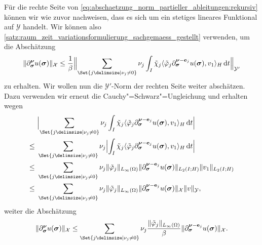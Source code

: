 \documentclass[../main.tex]{subfiles}
\begin{document}
\begin{Satz}
\begin{Beweis}
        Für die rechte Seite von \cref{eq:abschaetzung_norm_partieller_ableitungen:rekursiv} können wir wie zuvor nachweisen, dass es sich um ein stetiges lineares Funktional auf $\mathcal Y$ handelt.
        Wir können also \cref{satz:raum_zeit_variationsformulierung_sachgemaess_gestellt} verwenden, um die Abschätzung
        \begin{equation}
            \norm{\partial^{\bm\nu}_{\bm\sigma} u(\bm\sigma)}_{\mathcal X} \leq \frac{1}{\beta} \norm[\Big]{\sum_{\Set{j \given \nu_{j} \neq 0}} \nu_{j} \int_{I} \tilde{\chi}_{j} \skp{\tilde{\varphi}_{j} \partial^{\bm\nu - \vec e_{j}}_{\bm\sigma} u(\bm\sigma)}{v_{1}}{H} \diff t}_{\mathcal Y'}
        \end{equation}
        zu erhalten.
        Wir wollen nun die $\mathcal Y'$-Norm der rechten Seite weiter abschätzen.
        Dazu verwenden wir erneut die Cauchy"=Schwarz"=Ungleichung und erhalten wegen
        \begin{align}
            &\abs[\Big]{\sum_{\Set{j \given \nu_{j} \neq 0}} \nu_{j} \int_{I} \tilde{\chi}_{j} \skp{\tilde{\varphi}_{j} \partial^{\bm\nu - \vec e_{j}}_{\bm\sigma} u(\bm\sigma)}{v_{1}}{H} \diff t}
            \\\leq~
            &\sum_{\Set{j \given \nu_{j} \neq 0}} \nu_{j} \abs[\Big]{\int_{I} \tilde{\chi}_{j} \skp{\tilde{\varphi}_{j} \partial^{\bm\nu - \vec e_{j}}_{\bm\sigma} u(\bm\sigma)}{v_{1}}{H} \diff t}
            \\\leq~
            &\sum_{\Set{j \given \nu_{j} \neq 0}} \nu_{j} \norm{\tilde{\varphi}_{j}}_{L_{\infty}(\Omega)} \norm{\partial^{\bm\nu - \vec e_{j}}_{\bm\sigma} u(\bm\sigma)}_{L_{2}(I; H)} \norm{v_{1}}_{L_{2}(I; H)}
            \\\leq~
            &\sum_{\Set{j \given \nu_{j} \neq 0}} \nu_{j} \norm{\tilde{\varphi}_{j}}_{L_{\infty}(\Omega)} \norm{\partial^{\bm\nu - \vec e_{j}}_{\bm\sigma} u(\bm\sigma)}_{\mathcal X} \norm{v}_{\mathcal Y},
        \end{align}
        weiter die Abschätzung
        \begin{equation}
            \label{eq:abschaetzung_norm_partieller_ableitungen:rekursive_schranke}
            \norm{\partial^{\bm\nu}_{\bm\sigma} u(\bm\sigma)}_{\mathcal X} \leq \sum_{\Set{j \given \nu_{j} \neq 0}} \nu_{j} \frac{\norm{\tilde{\varphi}_{j}}_{L_{\infty}(\Omega)}}{\beta} \norm{\partial^{\bm\nu - \vec e_{j}}_{\bm\sigma} u(\bm\sigma)}_{\mathcal X}.
        \end{equation}


\end{Beweis}
\end{Satz}
\end{document}
